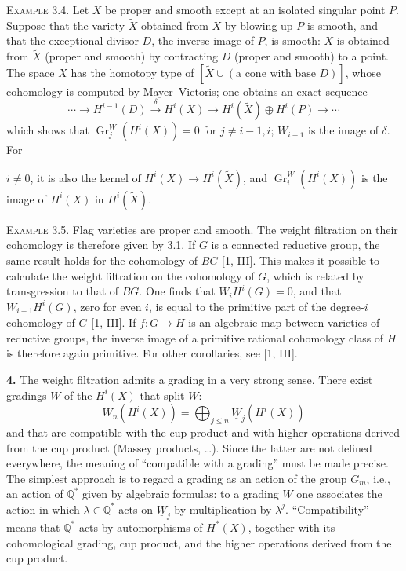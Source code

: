 \documentclass[8pt]{extarticle}
\newcommand{\DSourceFolio}{--}
\newcommand{\DAuthorityPage}{--}
\newcommand{\SourcePage}[2]{%
  \renewcommand{\DSourceFolio}{#1}%
  \renewcommand{\DAuthorityPage}{#2}%
  \thispagestyle{dpage}%
}
\newcommand{\EndSourcePage}{\clearpage}
\newcommand{\ReaderFont}{\fontsize{7.35}{8.15}\selectfont}
\newcommand{\NumPara}[1]{\par\noindent\textbf{#1}\enspace}
\newcommand{\NamedPara}[1]{\par\noindent\textsc{#1}\enspace}
\newcommand{\Q}{\mathbb{Q}}
\newcommand{\Gr}{\operatorname{Gr}}
\newcommand{\Wg}{\underline{W}}
\begin{document}
\NamedPara{Example 3.4.} Let \(X\) be proper and smooth except at an isolated singular point \(P\). Suppose that the variety \(\widetilde X\) obtained from \(X\) by blowing up \(P\) is smooth, and that the exceptional divisor \(D\), the inverse image of \(P\), is smooth: \(X\) is obtained from \(\widetilde X\) (proper and smooth) by contracting \(D\) (proper and smooth) to a point. The space \(X\) has the homotopy type of \([\widetilde X\cup(\text{a cone with base }D)]\), whose cohomology is computed by Mayer--Vietoris; one obtains an exact sequence
\[
\cdots\to H^{i-1}(D)\xrightarrow{\delta}H^i(X)\to H^i(\widetilde X)\oplus H^i(P)\to\cdots
\]
which shows that \(\Gr_j^W(H^i(X))=0\) for \(j\ne i-1,i\); \(W_{i-1}\) is the image of \(\delta\). For
\EndSourcePage

\SourcePage{81}{3}
\ReaderFont
\(i\ne0\), it is also the kernel of \(H^i(X)\to H^i(\widetilde X)\), and \(\Gr_i^W(H^i(X))\) is the image of \(H^i(X)\) in \(H^i(\widetilde X)\).

\NamedPara{Example 3.5.} Flag varieties are proper and smooth. The weight filtration on their cohomology is therefore given by 3.1. If \(G\) is a connected reductive group, the same result holds for the cohomology of \(BG\) [1, III]. This makes it possible to calculate the weight filtration on the cohomology of \(G\), which is related by transgression to that of \(BG\). One finds that \(W_iH^i(G)=0\), and that \(W_{i+1}H^i(G)\), zero for even \(i\), is equal to the primitive part of the degree-\(i\) cohomology of \(G\) [1, III]. If \(f:G\to H\) is an algebraic map between varieties of reductive groups, the inverse image of a primitive rational cohomology class of \(H\) is therefore again primitive. For other corollaries, see [1, III].

\NumPara{4.} The weight filtration admits a grading in a very strong sense. There exist gradings \(\Wg\) of the \(H^i(X)\) that split \(W\):
\begin{equation}\tag{4.1}
W_n(H^i(X))=\bigoplus_{j\le n}\Wg_j(H^i(X))
\end{equation}
and that are compatible with the cup product and with higher operations derived from the cup product (Massey products, \ldots). Since the latter are not defined everywhere, the meaning of “compatible with a grading” must be made precise. The simplest approach is to regard a grading as an action of the group \(G_m\), i.e., an action of \(\Q^*\) given by algebraic formulas: to a grading \(\Wg\) one associates the action in which \(\lambda\in\Q^*\) acts on \(\Wg_j\) by multiplication by \(\lambda^j\). “Compatibility” means that \(\Q^*\) acts by automorphisms of \(H^*(X)\), together with its cohomological grading, cup product, and the higher operations derived from the cup product.
\end{document}
